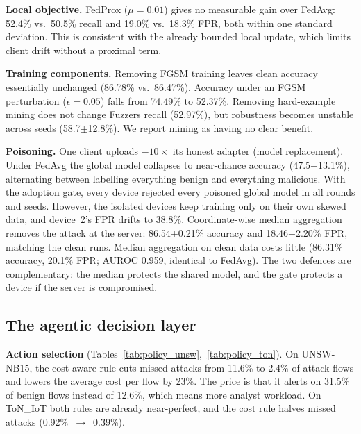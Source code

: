 \textbf{Local objective.} FedProx ($\mu{=}0.01$) gives no measurable gain over
FedAvg: 52.4\% vs.\ 50.5\% recall and 19.0\% vs.\ 18.3\% FPR, both within
one standard deviation. This is consistent with the already bounded local
update, which limits client drift without a proximal term.

\textbf{Training components.} Removing FGSM training leaves clean accuracy
essentially unchanged (86.78\% vs.\ 86.47\%). Accuracy under an FGSM
perturbation ($\epsilon{=}0.05$) falls from 74.49\% to 52.37\%. Removing
hard-example mining does not change Fuzzers recall (52.97\%), but robustness
becomes unstable across seeds (58.7$\pm$12.8\%). We report mining as having
no clear benefit.

\textbf{Poisoning.} One client uploads $-10\times$ its honest adapter
(model replacement). Under FedAvg the global model collapses to near-chance
accuracy (47.5$\pm$13.1\%), alternating between labelling everything benign
and everything malicious. With the adoption gate, every device rejected every
poisoned global model in all rounds and seeds. However, the isolated devices
keep training only on their own skewed data, and device~2's FPR drifts to
38.8\%. Coordinate-wise median aggregation removes the attack at the server:
86.54$\pm$0.21\% accuracy and 18.46$\pm$2.20\% FPR, matching the clean runs.
Median aggregation on clean data costs little (86.31\% accuracy, 20.1\% FPR;
AUROC 0.959, identical to FedAvg). The two defences are complementary: the
median protects the shared model, and the gate protects a device if the
server is compromised.

\subsection{The agentic decision layer}
\textbf{Action selection} (Tables~\ref{tab:policy_unsw},~\ref{tab:policy_ton}).
On UNSW-NB15, the cost-aware rule cuts missed attacks from 11.6\% to 2.4\% of
attack flows and lowers the average cost per flow by 23\%. The price is that
it alerts on 31.5\% of benign flows instead of 12.6\%, which means more
analyst workload. On ToN\_IoT both rules are already near-perfect, and the
cost rule halves missed attacks (0.92\%~$\rightarrow$~0.39\%).


